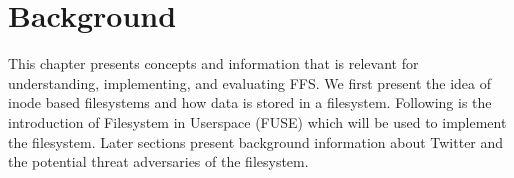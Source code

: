 \chapter{Background}

\label{ch:background}






This chapter presents concepts and information that is relevant for understanding, implementing, and evaluating FFS. We first present the idea of inode based filesystems and how data is stored in a filesystem. Following is the introduction of Filesystem in Userspace (FUSE) which will be used to implement the filesystem. Later sections present background information about Twitter and the potential threat adversaries of the filesystem. 









